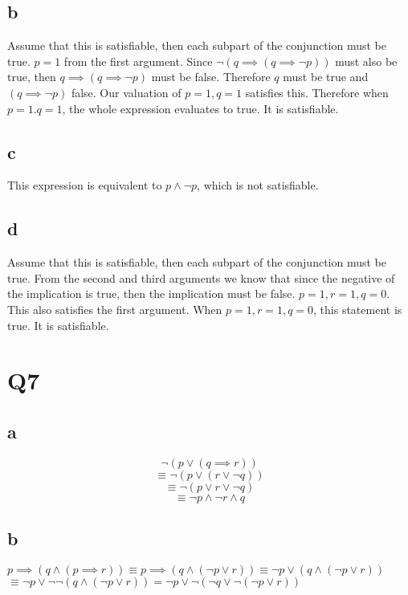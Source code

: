 \documentclass[12pt]{article}
\begin{document}
\subsection{b}
Assume that this is satisfiable, then each subpart of the conjunction must be true.
$p = 1$ from the first argument. Since $\neg(q \implies (q \implies \neg p))$ must also 
be true, then $q \implies (q \implies \neg p)$ must be false. Therefore $q$ must be true and 
$(q \implies \neg p)$ false. Our valuation of $p = 1, q = 1$ satisfies this. Therefore when $p = 1. q =1$, 
the whole expression evaluates to true. It is satisfiable.

\subsection{c}
This expression is equivalent to $p \land \neg p$, which is not satisfiable.

\subsection{d}
Assume that this is satisfiable, then each subpart of the conjunction must be true.
From the second and third arguments we know that since the negative of the implication is 
true, then the implication must be false. $p = 1, r = 1, q = 0$. This also satisfies the 
first argument. When $p = 1, r = 1, q = 0$, this statement is true. It is satisfiable.


\section{Q7}
\subsection{a}
$$\neg(p \lor (q \implies r))$$
$$\equiv \neg(p \lor (r \lor \neg q))$$
$$\equiv \neg (p \lor r \lor \neg q)$$
$$\equiv \neg p \land \neg r \land q$$

\subsection{b}
$p \implies (q \land (p \implies r)) \equiv p \implies (q \land (\neg p \lor r)) \equiv \neg p \lor (q \land (\neg p \lor r))$
\newline
$\equiv \neg p \lor \neg \neg (q \land (\neg p \lor r)) = \neg p \lor \neg (\neg q \lor \neg (\neg p \lor r))$
\end{document}
